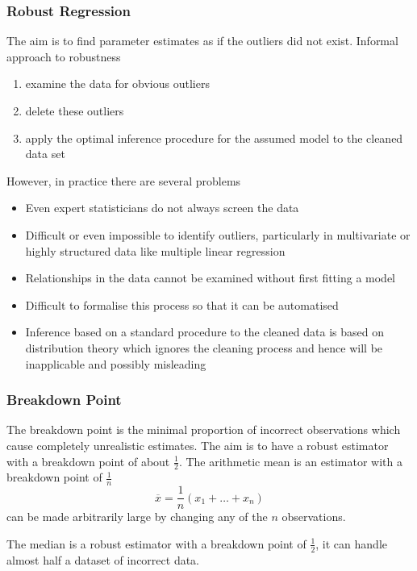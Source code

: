 \documentclass[11pt]{article}
\theoremstyle{definition}
\newcommand*\samplemean[1]{\overline{#1}}
\begin{document}
\subsubsection{Robust Regression}
The aim is to find parameter estimates as if the outliers did not exist. Informal approach to robustness
\begin{enumerate}[nosep]
	\item examine the data for obvious outliers
	\item delete these outliers
	\item apply the optimal inference procedure for the assumed model to the cleaned data set
\end{enumerate}
However, in practice there are several problems
\begin{itemize}
	\item Even expert statisticians do not always screen the data
	\item Difficult or even impossible to identify outliers, particularly in multivariate or highly structured data like multiple linear regression
	\item Relationships in the data cannot be examined without first fitting a model
	\item Difficult to formalise this process so that it can be automatised
	\item Inference based on a standard procedure to the cleaned data is based on distribution theory which ignores the cleaning process and hence will be inapplicable and possibly misleading
\end{itemize}

\subsubsection{Breakdown Point}
The breakdown point is the minimal proportion of incorrect observations which cause completely unrealistic estimates. The aim is to have a robust estimator with a breakdown point of about $\frac{1}{2}$. The arithmetic mean is an estimator with a breakdown point of $\frac{1}{n}$
\begin{equation}
	\samplemean{x} = \frac{1}{n}(x_1 + \dots + x_n)
\end{equation}
can be made arbitrarily large by changing any of the $n$ observations.

The median is a robust estimator with a breakdown point of $\frac{1}{2}$, it can handle almost half a dataset of incorrect data.
\end{document}
